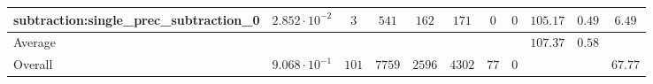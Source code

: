 \begin{tabular}{|l|c|c|c|c|c|c|c|c|c|c|}
subtraction:single\_prec\_subtraction\_0         & $ 2.852 \cdot 10^{-2} $ & $ 3      $ & $ 541  $ & $ 162  $ & $ 171   $ & $ 0  $ & $ 0 $ & $ 105.17      $ & $ 0.49    $ & $ 6.49    $ \\
\hline
Average                                          & $                     $ & $        $ & $      $ & $      $ & $       $ & $    $ & $   $ & $ 107.37      $ & $ 0.58    $ & $         $ \\
\hline
Overall                                          & $ 9.068 \cdot 10^{-1} $ & $ 101    $ & $ 7759 $ & $ 2596 $ & $ 4302  $ & $ 77 $ & $ 0 $ & $             $ & $         $ & $ 67.77   $ \\
\hline
\end{tabular}
